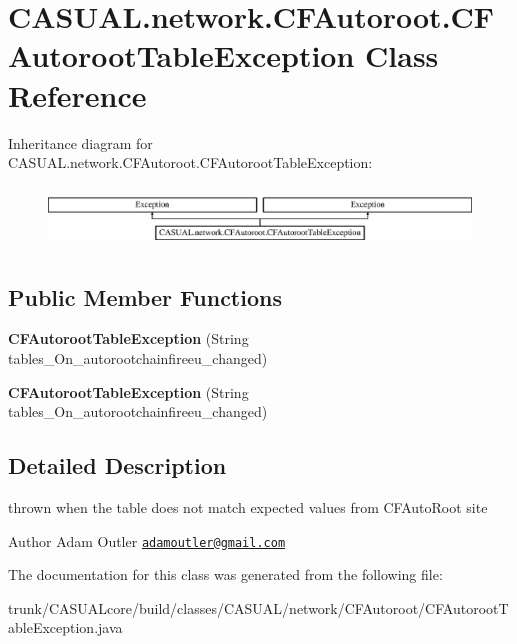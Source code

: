 \hypertarget{class_c_a_s_u_a_l_1_1network_1_1_c_f_autoroot_1_1_c_f_autoroot_table_exception}{\section{C\-A\-S\-U\-A\-L.\-network.\-C\-F\-Autoroot.\-C\-F\-Autoroot\-Table\-Exception Class Reference}
\label{class_c_a_s_u_a_l_1_1network_1_1_c_f_autoroot_1_1_c_f_autoroot_table_exception}
}
Inheritance diagram for C\-A\-S\-U\-A\-L.\-network.\-C\-F\-Autoroot.\-C\-F\-Autoroot\-Table\-Exception\-:\begin{figure}[H]
\begin{center}
\leavevmode
\includegraphics[height=1.637427cm]{class_c_a_s_u_a_l_1_1network_1_1_c_f_autoroot_1_1_c_f_autoroot_table_exception}
\end{center}
\end{figure}
\subsection*{Public Member Functions}
\begin{DoxyCompactItemize}
\item 
\hypertarget{class_c_a_s_u_a_l_1_1network_1_1_c_f_autoroot_1_1_c_f_autoroot_table_exception_af1b18274a660e19647527c4877d8583c}{{\bfseries C\-F\-Autoroot\-Table\-Exception} (String tables\-\_\-\-On\-\_\-autorootchainfireeu\-\_\-changed)}\label{class_c_a_s_u_a_l_1_1network_1_1_c_f_autoroot_1_1_c_f_autoroot_table_exception_af1b18274a660e19647527c4877d8583c}

\item 
\hypertarget{class_c_a_s_u_a_l_1_1network_1_1_c_f_autoroot_1_1_c_f_autoroot_table_exception_af1b18274a660e19647527c4877d8583c}{{\bfseries C\-F\-Autoroot\-Table\-Exception} (String tables\-\_\-\-On\-\_\-autorootchainfireeu\-\_\-changed)}\label{class_c_a_s_u_a_l_1_1network_1_1_c_f_autoroot_1_1_c_f_autoroot_table_exception_af1b18274a660e19647527c4877d8583c}

\end{DoxyCompactItemize}


\subsection{Detailed Description}
thrown when the table does not match expected values from C\-F\-Auto\-Root site \begin{DoxyAuthor}{Author}
Adam Outler \href{mailto:adamoutler@gmail.com}{\tt adamoutler@gmail.\-com} 
\end{DoxyAuthor}


The documentation for this class was generated from the following file\-:\begin{DoxyCompactItemize}
\item 
trunk/\-C\-A\-S\-U\-A\-Lcore/build/classes/\-C\-A\-S\-U\-A\-L/network/\-C\-F\-Autoroot/C\-F\-Autoroot\-Table\-Exception.\-java\end{DoxyCompactItemize}
